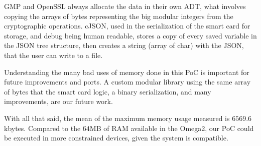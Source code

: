 GMP and OpenSSL always allocate the data in their own ADT, what involves copying the arrays of bytes representing the big modular integers from the cryptographic operations. cJSON, used in the serialization of the smart card for storage, and debug being human readable, stores a copy of every saved variable in the JSON tree structure, then creates a string (array of char) with the JSON, that the user can write to a file.

Understanding the many bad uses of memory done in this PoC is important for future improvements and ports. A custom modular library using the same array of bytes that the smart card logic, a binary serialization, and many improvements, are our future work.

With all that said, the mean of the maximum memory usage measured is $6569.6$ kbytes. Compared to the $64$MB of RAM available in the Omega2, our PoC could be executed in more constrained devices, given the system is compatible.































